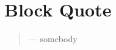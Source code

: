 \hypertarget{quote}{%
\section{Block Quote}\label{sec:quote}}

\begin{quote}
\blindtext
--- somebody
\end{quote}